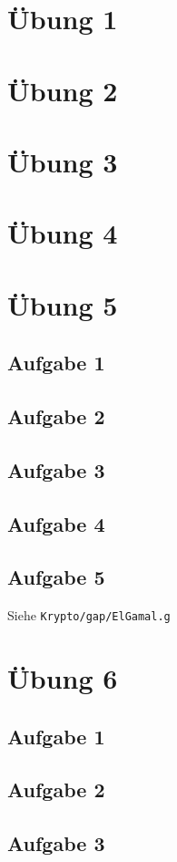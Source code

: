 \documentclass[a4paper,12pt,twoside]{article}
\theoremstyle{definition}
\begin{document}
\section{Übung 1}
\section{Übung 2}
\section{Übung 3}
\section{Übung 4}
\newpage

\section{Übung 5}
\subsection{Aufgabe 1}
\subsection{Aufgabe 2}
\subsection{Aufgabe 3}
\subsection{Aufgabe 4}
\subsection{Aufgabe 5}
Siehe \texttt{Krypto/gap/ElGamal.g}
\newpage
\section{Übung 6}
\subsection{Aufgabe 1}
\subsection{Aufgabe 2}


\subsection{Aufgabe 3}
\end{document}

